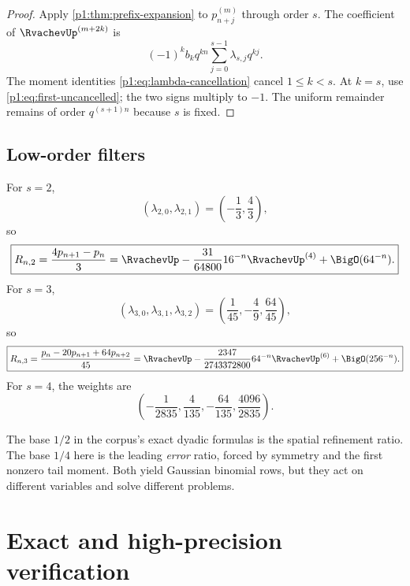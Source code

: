 \documentclass[11pt]{article}
\numberwithin{equation}{section}
\theoremstyle{definition}
\theoremstyle{remark}
\begin{document}
\begin{proof}
Apply \cref{p1:thm:prefix-expansion} to $p_{n+j}^{(m)}$ through order $s$.  The coefficient of
\(\RvachevUp^{(m+2k)}\) is
\[
 (-1)^kb_kq^{kn}\sum_{j=0}^{s-1}\lambda_{s,j}q^{kj}.
\]
The moment identities \eqref{p1:eq:lambda-cancellation} cancel $1\le k<s$.  At $k=s$, use \eqref{p1:eq:first-uncancelled}; the two signs multiply to $-1$.  The uniform remainder remains of order $q^{(s+1)n}$ because $s$ is fixed.
\end{proof}

\subsection{Low-order filters}

For $s=2$,
\begin{equation}
 (\lambda_{2,0},\lambda_{2,1})=\left(-\frac13,\frac43\right),
 \end{equation}
so
\begin{equation}
 \boxed{
 R_{n,2}=\frac{4p_{n+1}-p_n}{3}
 =\RvachevUp-\frac{31}{64800}16^{-n}\RvachevUp^{(4)}+\BigO(64^{-n}).}
 \label{p1:eq:Rn2}
\end{equation}
For $s=3$,
\begin{equation}
 (\lambda_{3,0},\lambda_{3,1},\lambda_{3,2})
 =\left(\frac1{45},-\frac49,\frac{64}{45}\right),
\end{equation}
so
\begin{equation}
 \boxed{
 R_{n,3}=\frac{p_n-20p_{n+1}+64p_{n+2}}{45}
 =\RvachevUp-\frac{2347}{2743372800}64^{-n}\RvachevUp^{(6)}
 +\BigO(256^{-n}).}
 \label{p1:eq:Rn3}
\end{equation}
For $s=4$, the weights are
\begin{equation}
 \left(-\frac1{2835},\frac4{135},-\frac{64}{135},\frac{4096}{2835}\right).
 \label{p1:eq:R4-weights}
\end{equation}

\begin{remark}
The base $1/2$ in the corpus's exact dyadic formulas is the spatial refinement ratio.  The base $1/4$ here is the leading \emph{error} ratio, forced by symmetry and the first nonzero tail moment.  Both yield Gaussian binomial rows, but they act on different variables and solve different problems.
\end{remark}

\section{Exact and high-precision verification}
\label{p1:sec:verification}
\end{document}
